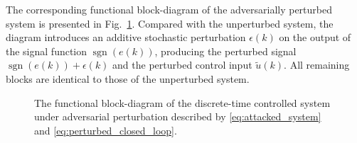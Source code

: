 The corresponding functional block-diagram of the adversarially perturbed
system is presented in Fig.~\ref{fig:attacked-system}. Compared with the unperturbed
system, the diagram introduces an additive
stochastic perturbation $\epsilon(k)$ on the output of the signal function
$\operatorname{sgn}(e(k))$, producing the perturbed signal
$\operatorname{sgn}(e(k)) + \epsilon(k)$
and the perturbed control input $\tilde{u}(k)$. All remaining blocks
are identical to those of the unperturbed system.
\begin{figure}[H]
	\centering
	\caption{The functional block-diagram of the discrete-time controlled system under adversarial perturbation described by \eqref{eq:attacked_system} and \eqref{eq:perturbed_closed_loop}.}
	\label{fig:attacked-system}
\end{figure}
